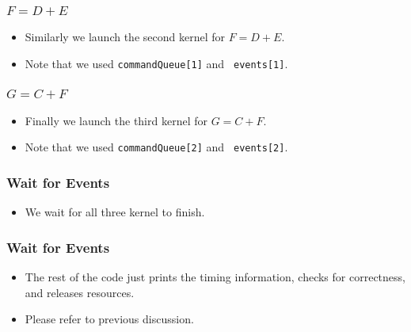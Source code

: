 \documentclass{beamer}
\begin{document}
\begin{frame}
\end{frame}

\begin{frame}
  \frametitle{$F = D + E$}
  \begin{itemize}
    \item Similarly  we launch the second kernel for $F = D + E$.
      \item Note that we used {\tt commandQueue[1]} and {\tt
        events[1]}.
  \end{itemize}
\end{frame}

\begin{frame}
\end{frame}

\begin{frame}
  \frametitle{$G = C + F$}
  \begin{itemize}
    \item Finally  we launch the third kernel for $G = C + F$.
    \item Note that we used {\tt commandQueue[2]} and {\tt
      events[2]}.
  \end{itemize}
\end{frame}

\begin{frame}
\end{frame}

\begin{frame}
  \frametitle{Wait for Events}
  \begin{itemize}
    \item We wait for all three kernel to finish.
  \end{itemize}
\end{frame}

\begin{frame}
\end{frame}

\begin{frame}
  \frametitle{Wait for Events}
  \begin{itemize}
  \item The rest of the code just prints the timing information, checks
    for correctness, and releases resources.
  \item Please refer to previous discussion.
  \end{itemize}
\end{frame}
\end{document}
